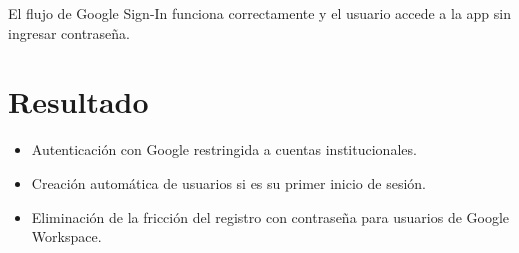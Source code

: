 \begin{exito}
El flujo de Google Sign-In funciona correctamente y el usuario accede a la app sin ingresar contraseña.
\end{exito}

\section{Resultado}

\begin{exito}
\begin{itemize}[leftmargin=*]
  \item Autenticación con Google restringida a cuentas institucionales.
  \item Creación automática de usuarios si es su primer inicio de sesión.
  \item Eliminación de la fricción del registro con contraseña para usuarios de Google Workspace.
\end{itemize}
\end{exito}
